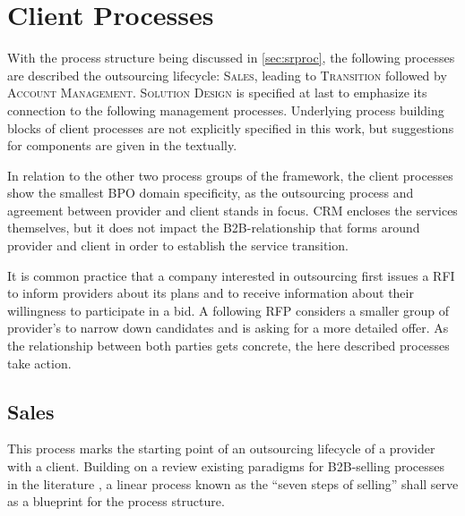 	\newpage
	
	
	
	
	\section{Client Processes}
	With the process structure being discussed in \ref{sec:srproc}, the following processes are described \wrt the outsourcing lifecycle: \textsc{Sales}, leading to \textsc{Transition} followed by \textsc{Account Management}. \textsc{Solution Design} is specified at last to emphasize its connection to the following management processes. Underlying process building blocks of client processes are not explicitly specified in this work, but suggestions for components are given in the textually. 
	
	In relation to the other two process groups of the framework, the client processes show the smallest \acrshort{BPO} domain specificity, as the outsourcing process and agreement between provider and client stands in focus. \acrshort{CRM} encloses the services themselves, but it does not impact the B2B-relationship that forms around provider and client in order to establish the service transition. 
	
	It is common practice that a company interested in outsourcing first issues a \acrfull{RFI} to inform providers about its plans and to receive information about their willingness to participate in a bid. A following \acrfull{RFP} considers a smaller group of provider's to narrow down candidates and is asking for a more detailed offer. As the relationship between both parties gets concrete, the here described processes take action. 
	
	\subsection{Sales}
	\label{pr:sal}
	This process marks the starting point of an outsourcing lifecycle of a provider with a client. Building on a review existing paradigms for B2B-selling processes in the literature \citep{_ge_2011}, a linear process known as the  \enquote{seven steps of selling} shall serve as a blueprint for the process structure. 
	
